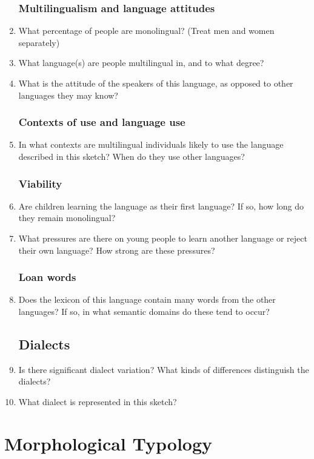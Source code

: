 \documentclass[twocolumn]{scrartcl}
\begin{document}
\begin{enumerate}
\subsubsection{Multilingualism and language attitudes}
\item What percentage of people are monolingual? (Treat men and women separately)
\item What language(s) are people multilingual in, and to what degree?
\item What is the attitude of the speakers of this language, as opposed to other languages they may know?
\subsubsection{Contexts of use and language use}
\item In what contexts are multilingual individuals likely to use the language described in this sketch?  When do they use other languages?
\subsubsection{Viability}
\item Are children learning the language as their first language?  If so, how long do they remain monolingual?
\item What pressures are there on young people to learn another language or reject their own language?  How strong are these pressures?
\subsubsection{Loan words}
\item Does the lexicon of this language contain many words from the other languages? If so, in what semantic domains do these tend to occur?
\subsection{Dialects}
\item Is there significant dialect variation? What kinds of differences distinguish the dialects?
\item What dialect is represented in this sketch?
\end{enumerate}
\section{Morphological Typology}
\end{document}

